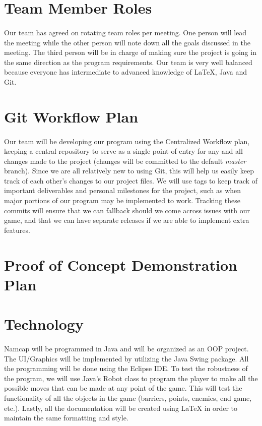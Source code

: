 \documentclass{article}
\begin{document}
\section{Team Member Roles}

\paragraph{}
Our team has agreed on rotating team roles per meeting. One person will lead the meeting while the other person will note down all the goals discussed in the meeting. The third person will be in charge of making sure the project is going in the same direction as the program requirements. Our team is very well balanced because everyone has intermediate to advanced knowledge of LaTeX, Java and Git.

\section{Git Workflow Plan}

\paragraph{}
Our team will be developing our program using the Centralized Workflow plan, keeping a central repository to serve as a single point-of-entry for any and all changes made to the project (changes will be committed to the default \textit{master} branch). Since we are all relatively new to using Git, this will help us easily keep track of each other's changes to our project files. We will use tags to keep track of important deliverables and personal milestones for the project, such as when major portions of our program may be implemented to work. Tracking these commits will ensure that we can fallback should we come across issues with our game, and that we can have separate releases if we are able to implement extra features.

\section{Proof of Concept Demonstration Plan}

\section{Technology}

\paragraph{}
Namcap will be programmed in Java and will be organized as an OOP project. The UI/Graphics will be implemented by utilizing the Java Swing package. All the programming will be done using the Eclipse IDE. To test the robustness of the program, we will use Java's Robot class to program the player to make all the possible moves that can be made at any point of the game. This will test the functionality of all the objects in the game (barriers, points, enemies, end game, etc.). Lastly, all the documentation will be created using LaTeX in order to maintain the same formatting and style.
\end{document}

